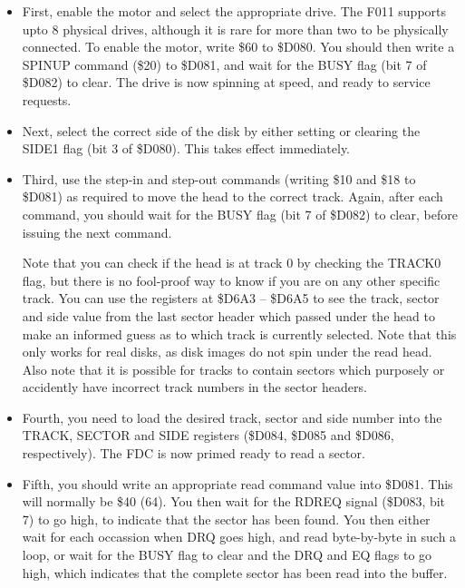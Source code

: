 \begin{itemize}
\item First, enable the motor and select the appropriate drive. The F011
  supports upto 8 physical drives, although it is rare for more than two
  to be physically connected.  To enable the motor, write \$60 to \$D080.
  You should then write a SPINUP command (\$20) to \$D081, and wait for
  the BUSY flag (bit 7 of \$D082) to clear.  The drive is now spinning
  at speed, and ready to service requests.
\item Next, select the correct side of the disk by either setting or clearing
  the SIDE1 flag (bit 3 of \$D080).  This takes effect immediately.
\item Third, use the step-in and step-out commands (writing \$10 and \$18 to
  \$D081) as required to move the head to the correct track. Again, after each
  command, you should wait for the BUSY flag (bit 7 of \$D082) to clear, before
  issuing the next command.

  Note that you can check if the head is at track 0
  by checking the TRACK0 flag, but there is no fool-proof way to know if you
  are on any other specific track.  You can use the registers at \$D6A3 --
  \$D6A5 to see the track, sector and side value from the last sector header
  which passed under the head to make an informed guess as to which track
  is currently selected. Note that this only works for real disks, as disk
  images do not spin under the read head. Also note that it is possible for
  tracks to contain sectors which purposely or accidently have incorrect
  track numbers in the sector headers.

  \item Fourth, you need to load the desired track, sector and
side number into the TRACK, SECTOR and SIDE registers (\$D084, \$D085
and \$D086, respectively). The FDC is now primed ready to read a sector.

\item Fifth, you should write an appropriate read command
value into \$D081.  This will normally be \$40 (64).  You then wait
for the RDREQ signal (\$D083, bit 7) to go high, to indicate that the
sector has been found. You then either wait for each occassion when
DRQ goes high, and read byte-by-byte in such a loop, or wait for the
BUSY flag to clear and the DRQ and EQ flags to go high, which indicates
that the complete sector has been read into the buffer.

\end{itemize}

